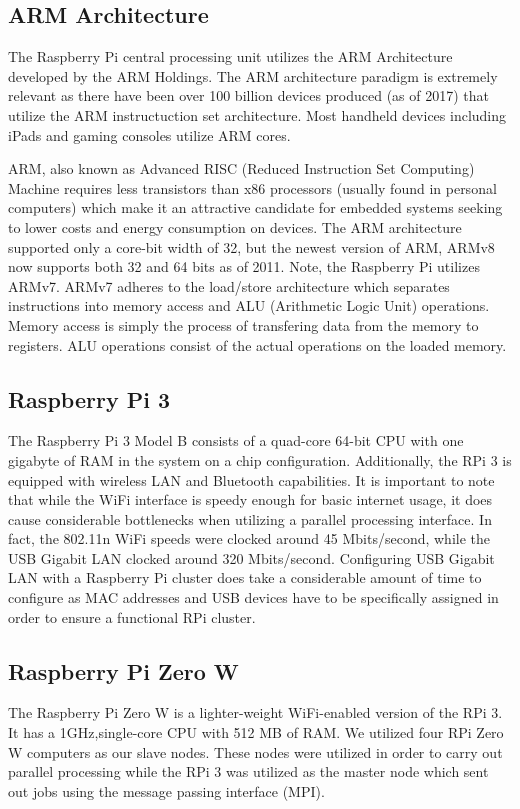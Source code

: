 \subsection{ARM Architecture}

	The Raspberry Pi central processing unit utilizes the ARM Architecture developed by the ARM Holdings. The ARM architecture paradigm is extremely relevant as there have been over 100 billion devices produced (as of 2017) that utilize the ARM instructuction set architecture. Most handheld devices including iPads and gaming consoles utilize ARM cores.
	
	ARM, also known as Advanced RISC (Reduced Instruction Set Computing) Machine requires less transistors than x86 processors (usually found in personal computers) which make it an attractive candidate for embedded systems seeking to lower costs and energy consumption on devices. The ARM architecture supported only a core-bit width of 32, but the newest version of ARM, ARMv8 now supports both 32 and 64 bits as of 2011. Note, the Raspberry Pi utilizes ARMv7. ARMv7 adheres to the load/store architecture which separates instructions into memory access and ALU (Arithmetic Logic Unit) operations. Memory access is simply the process of transfering data from the memory to registers. ALU operations consist of the actual operations on the loaded memory. 

\subsection{Raspberry Pi 3}
	The Raspberry Pi 3 Model B consists of a quad-core 64-bit CPU with one gigabyte of RAM in the system on a chip configuration. Additionally, the RPi 3 is equipped with wireless LAN and Bluetooth capabilities. It is important to note that while the WiFi interface is speedy enough for basic internet usage, it does cause considerable bottlenecks when utilizing a parallel processing interface. In fact, the 802.11n WiFi speeds were clocked around 45 Mbits/second, while the USB Gigabit LAN clocked around 320 Mbits/second. Configuring USB Gigabit LAN with a Raspberry Pi cluster does take a considerable amount of time to configure as MAC addresses and USB devices have to be specifically assigned in order to ensure a functional RPi cluster. 

\subsection{Raspberry Pi Zero W}
	The Raspberry Pi Zero W is a lighter-weight WiFi-enabled version of the RPi 3. It has a 1GHz,single-core CPU with 512 MB of RAM. We utilized four RPi Zero W computers as our slave nodes. These nodes were utilized in order to carry out parallel processing while the RPi 3 was utilized as the master node which sent out jobs using the message passing interface (MPI). 

